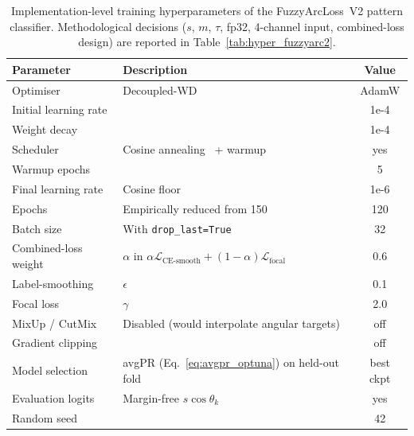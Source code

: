 \begin{table}[ht!]
\centering
\small
\caption{Implementation-level training hyperparameters of the
FuzzyArcLoss~V2 pattern classifier.
Methodological decisions ($s$, $m$, $\tau$, fp32, 4-channel input,
combined-loss design) are reported in
Table~\ref{tab:hyper_fuzzyarc2}.}
\label{tab:hyper_pattern_classifier}
\begin{tabular}{l l c}
\hline
\textbf{Parameter} & \textbf{Description} & \textbf{Value} \\
\hline
Optimiser               & Decoupled-WD~\cite{loshchilov2019adamw}             & AdamW \\
Initial learning rate   &                                                     & 1e-4 \\
Weight decay            &                                                     & 1e-4 \\
Scheduler               & Cosine annealing~\cite{loshchilov2017sgdr} + warmup & yes \\
Warmup epochs           &                                                     & 5 \\
Final learning rate     & Cosine floor                                        & 1e-6 \\
Epochs                  & Empirically reduced from 150                        & 120 \\
Batch size              & With \texttt{drop\_last=True}                       & 32 \\
Combined-loss weight    & $\alpha$ in $\alpha\mathcal{L}_{\text{CE-smooth}} + (1-\alpha)\mathcal{L}_{\text{focal}}$ & 0.6 \\
Label-smoothing         & $\epsilon$~\cite{szegedy2016rethinking}             & 0.1 \\
Focal loss              & $\gamma$~\cite{lin2017focal}                        & 2.0 \\
MixUp / CutMix          & Disabled (would interpolate angular targets)        & off \\
Gradient clipping       &                                                     & off \\
Model selection         & avgPR (Eq.~\ref{eq:avgpr_optuna}) on held-out fold  & best ckpt \\
Evaluation logits       & Margin-free $s\cos\theta_k$                         & yes \\
Random seed             &                                                     & 42 \\
\hline
\end{tabular}
\end{table}

